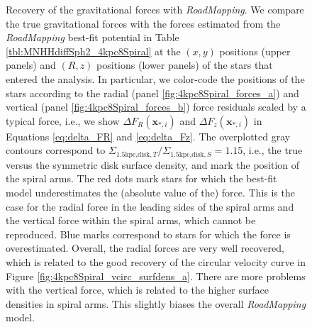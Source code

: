 \documentclass[iop,revtex4,numberedappendix,appendixfloats]{emulateapj}
\newcommand{\vect}[1]{\boldsymbol{#1}}
\newcommand{\RM}{{\sl RoadMapping}}
\begin{document}
\begin{figure}[!htbp]
\caption{Recovery of the gravitational forces with \RM{}. We compare the true gravitational forces with the forces estimated from the \RM{} best-fit potential in Table \ref{tbl:MNHHdiffSph2_4kpc8Spiral} at the $(x,y)$ positions (upper panels) and $(R,z)$ positions (lower panels) of the stars that entered the analysis. In particular, we color-code the positions of the stars according to the radial (panel \ref{fig:4kpc8Spiral_forces_a}) and vertical (panel \ref{fig:4kpc8Spiral_forces_b}) force residuals scaled by a typical force, i.e., we show $\Delta F_R(\vect{x}_{*,i})$ and $\Delta F_z(\vect{x}_{*,i})$ in Equations \eqref{eq:delta_FR} and \eqref{eq:delta_Fz}. The overplotted gray contours correspond to $\Sigma_{\text{1.5kpc,disk},T}/\Sigma_{\text{1.5kpc,disk},S}=1.15$, i.e., the true versus the symmetric disk surface density, and mark the position of the spiral arms. The red dots mark stars for which the best-fit model underestimates the (absolute value of the) force. This is the case for the radial force in the leading sides of the spiral arms and the vertical force within the spiral arms, which cannot be reproduced. Blue marks correspond to stars for which the force is overestimated. Overall, the radial forces are very well recovered, which is related to the good recovery of the circular velocity curve in Figure \ref{fig:4kpc8Spiral_vcirc_surfdens_a}. There are more problems with the vertical force, which is related to the higher surface densities in spiral arms. This slightly biases the overall \RM{} model.}
\label{fig:4kpc8Spiral_forces}
\end{figure}
\end{document}
